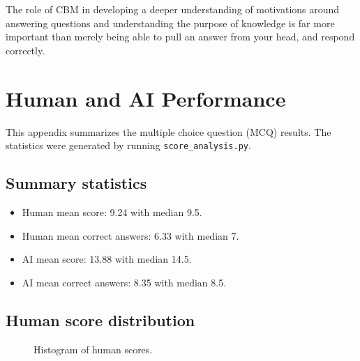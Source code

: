 \documentclass[sigconf]{acmart}
\begin{document}
The role of CBM in developing a deeper understanding of motivations around answering questions and understanding the purpose of knowledge is far more important than merely being able to pull an answer from your head, and respond correctly.  





\section*{Human and AI Performance}
This appendix summarizes the multiple choice question (MCQ) results.
The statistics were generated by running \texttt{score\_analysis.py}.

\subsection*{Summary statistics}
\begin{itemize}
  \item Human mean score: 9.24 with median 9.5.
  \item Human mean correct answers: 6.33 with median 7.
  \item AI mean score: 13.88 with median 14.5.
  \item AI mean correct answers: 8.35 with median 8.5.
\end{itemize}

\subsection*{Human score distribution}
\begin{figure}[h]
  \centering
  \caption{Histogram of human scores.}
\end{figure}
\end{document}
